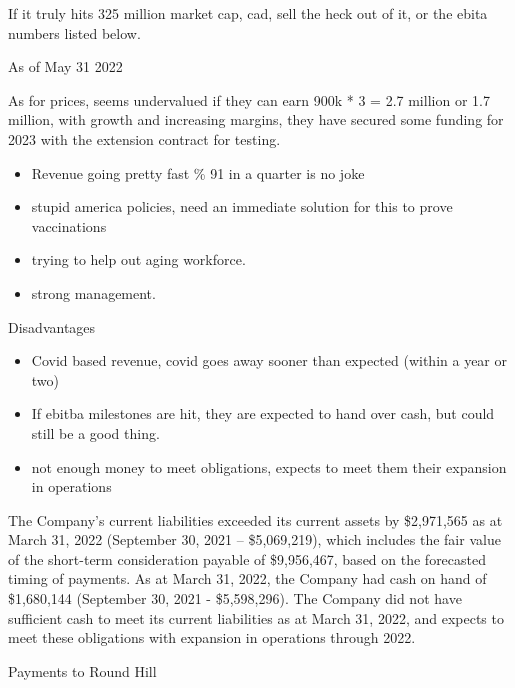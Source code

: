 If it truly hits 325 million market cap, cad, sell the heck out of it, or the ebita numbers listed below.

As of May 31 2022

As for prices, seems undervalued if they can earn 900k * 3 = 2.7 million or 1.7 million,  with growth and increasing margins, they have secured some funding for 2023 with the extension contract for testing.

\begin{itemize}
    \item Revenue going pretty fast \% 91 in a quarter is no joke
    \item stupid america policies, need an immediate solution for this to prove vaccinations
    \item trying to help out aging workforce.
    \item strong management.
\end{itemize}

Disadvantages

\begin{itemize}
    \item Covid based revenue, covid goes away sooner than expected (within a year or two)
    \item If ebitba milestones are hit, they are expected to hand over cash, but could still be a good thing.
    \item not enough money to meet obligations, expects to meet them their expansion in operations
\end{itemize}

The Company’s current liabilities exceeded its current assets by \$2,971,565 as at March 31, 2022
(September 30, 2021 – \$5,069,219), which includes the fair value of the short-term consideration payable of
\$9,956,467, based on the forecasted timing of payments. As at March 31, 2022, the Company had cash on
hand of \$1,680,144 (September 30, 2021 - \$5,598,296). The Company did not have sufficient cash to meet
its current liabilities as at March 31, 2022, and expects to meet these obligations with expansion in operations through 2022.

Payments to Round Hill

